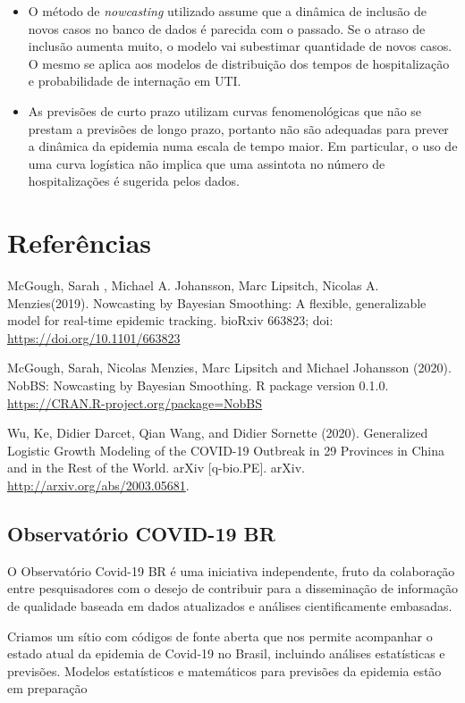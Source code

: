 \documentclass[
]{article}
\begin{document}
\begin{itemize}
\item
  O método de \emph{nowcasting} utilizado assume que a dinâmica de
  inclusão de novos casos no banco de dados é parecida com o passado. Se
  o atraso de inclusão aumenta muito, o modelo vai subestimar quantidade
  de novos casos. O mesmo se aplica aos modelos de distribuição dos
  tempos de hospitalização e probabilidade de internação em UTI.
\item
  As previsões de curto prazo utilizam curvas fenomenológicas que não se
  prestam a previsões de longo prazo, portanto não são adequadas para
  prever a dinâmica da epidemia numa escala de tempo maior. Em
  particular, o uso de uma curva logística não implica que uma assintota
  no número de hospitalizações é sugerida pelos dados.
\end{itemize}

\hypertarget{referuxeancias}{%
\section{Referências}\label{referuxeancias}}

McGough, Sarah , Michael A. Johansson, Marc Lipsitch, Nicolas A.
Menzies(2019). Nowcasting by Bayesian Smoothing: A flexible,
generalizable model for real-time epidemic tracking. bioRxiv 663823;
doi: \url{https://doi.org/10.1101/663823}

McGough, Sarah, Nicolas Menzies, Marc Lipsitch and Michael Johansson
(2020). NobBS: Nowcasting by Bayesian Smoothing. R package version
0.1.0. \url{https://CRAN.R-project.org/package=NobBS}

Wu, Ke, Didier Darcet, Qian Wang, and Didier Sornette (2020).
Generalized Logistic Growth Modeling of the COVID-19 Outbreak in 29
Provinces in China and in the Rest of the World. arXiv {[}q-bio.PE{]}.
arXiv. \url{http://arxiv.org/abs/2003.05681}.

\hypertarget{observatuxf3rio-covid-19-br}{%
\subsection{Observatório COVID-19
BR}\label{observatuxf3rio-covid-19-br}}

O Observatório Covid-19 BR é uma iniciativa independente, fruto da
colaboração entre pesquisadores com o desejo de contribuir para a
disseminação de informação de qualidade baseada em dados atualizados e
análises cientificamente embasadas.

Criamos um sítio com códigos de fonte aberta que nos permite acompanhar
o estado atual da epidemia de Covid-19 no Brasil, incluindo análises
estatísticas e previsões. Modelos estatísticos e matemáticos para
previsões da epidemia estão em preparação
\end{document}
